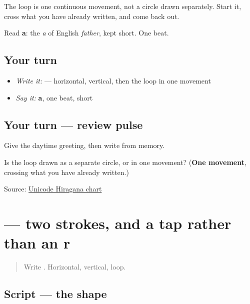 The loop is one continuous movement, not a circle drawn separately. Start it, cross what you have already written, and come back out.

Read \textbf{a}: the \emph{a} of English \emph{father}, kept short. One beat.

\subsection*{Your turn}
\begin{itemize}
\raggedright
  \item \emph{Write it:}  — horizontal, vertical, then the loop in one movement
  \item \emph{Say it:} \textbf{a}, one beat, short
\end{itemize}

\subsection*{Your turn — review pulse}
Give the daytime greeting, then write \textbf{} from memory.

\begin{tcolorbox}[breakable,colback=teal!4,colframe=teal!35!black,title={Before you move on}]
Is the loop drawn as a separate circle, or in one movement? (\textbf{One movement}, crossing what you have already written.)

Source: \href{https://www.unicode.org/charts/PDF/U3040.pdf}{Unicode Hiragana chart}
\end{tcolorbox}
\section[\texorpdfstring{\ja{り} (ri)}{り (ri)}]{ — two strokes, and a tap rather than an r}

\label{lesson:JA-W03-ri}



\begin{quote}
Write . Horizontal, vertical, loop.
\end{quote}

\subsection*{Script — the shape}

\begin{quote}
\end{quote}

